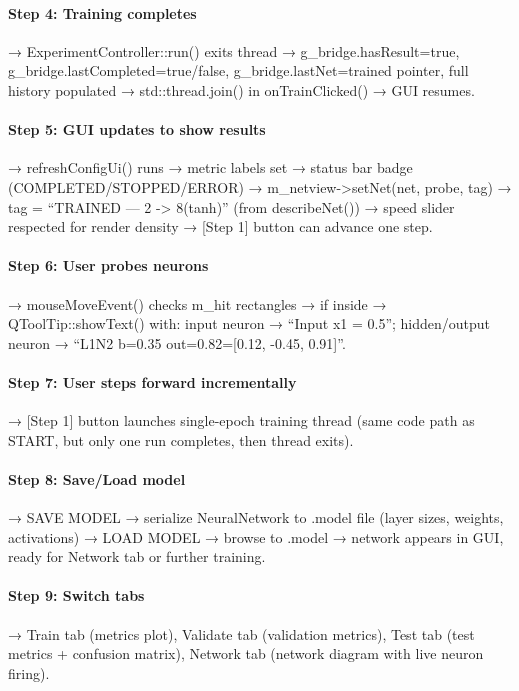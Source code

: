 \documentclass[12pt]{article}
\begin{document}
\paragraph{Step 4: Training completes} → ExperimentController::run() exits thread → g\_bridge.hasResult=true, g\_bridge.lastCompleted=true/false, g\_bridge.lastNet=trained pointer, full history populated → std::thread.join() in onTrainClicked() → GUI resumes.

\paragraph{Step 5: GUI updates to show results} → refreshConfigUi() runs → metric labels set → status bar badge (COMPLETED/STOPPED/ERROR) → m\_netview->setNet(net, probe, tag) → tag = ``TRAINED — 2 -> 8(tanh)'' (from describeNet()) → speed slider respected for render density → [Step 1] button can advance one step.

\paragraph{Step 6: User probes neurons} → mouseMoveEvent() checks m\_hit rectangles → if inside → QToolTip::showText() with: input neuron → ``Input x1 = 0.5''; hidden/output neuron → ``L1N2 b=0.35 out=0.82\nw=[0.12, -0.45, 0.91]''.

\paragraph{Step 7: User steps forward incrementally} → [Step 1] button launches single-epoch training thread (same code path as START, but only one run completes, then thread exits).

\paragraph{Step 8: Save/Load model} → SAVE MODEL → serialize NeuralNetwork to .model file (layer sizes, weights, activations) → LOAD MODEL → browse to .model → network appears in GUI, ready for Network tab or further training.

\paragraph{Step 9: Switch tabs} → Train tab (metrics plot), Validate tab (validation metrics), Test tab (test metrics + confusion matrix), Network tab (network diagram with live neuron firing).
\end{document}
